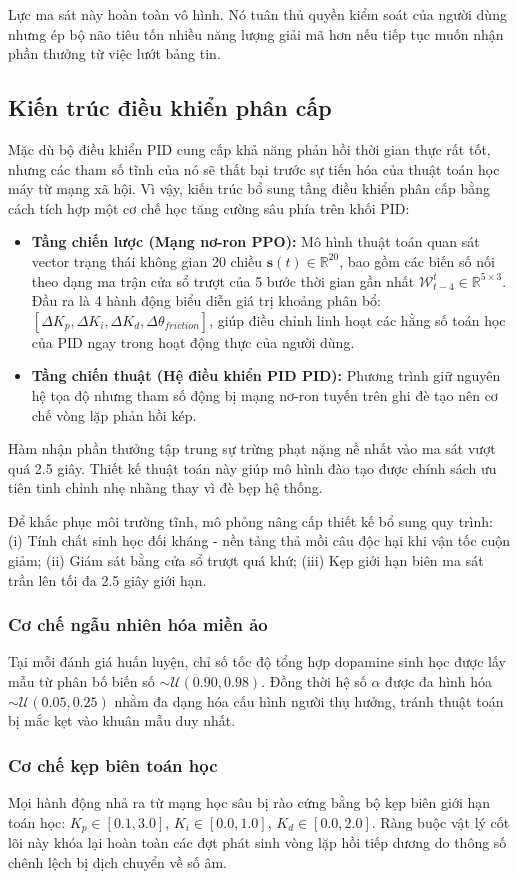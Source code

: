 Lực ma sát này hoàn toàn vô hình. Nó tuân thủ quyền kiểm soát của người dùng nhưng ép bộ não tiêu tốn nhiều năng lượng giải mã hơn nếu tiếp tục muốn nhận phần thưởng từ việc lướt bảng tin.

\subsection{Kiến trúc điều khiển phân cấp}

Mặc dù bộ điều khiển PID cung cấp khả năng phản hồi thời gian thực rất tốt, nhưng các tham số tĩnh của nó sẽ thất bại trước sự tiến hóa của thuật toán học máy từ mạng xã hội. Vì vậy, kiến trúc bổ sung tầng điều khiển phân cấp bằng cách tích hợp một cơ chế học tăng cường sâu phía trên khối PID:

\begin{itemize}
    \item \textbf{Tầng chiến lược (Mạng nơ-ron PPO):} Mô hình thuật toán quan sát vector trạng thái không gian 20 chiều $\mathbf{s}(t) \in \mathbb{R}^{20}$, bao gồm các biến số nối theo dạng ma trận cửa sổ trượt của 5 bước thời gian gần nhất $\mathcal{W}_{t-4}^{t} \in \mathbb{R}^{5 \times 3}$. Đầu ra là 4 hành động biểu diễn giá trị khoảng phân bổ: $[\Delta K_p, \Delta K_i, \Delta K_d, \Delta\theta_{friction}]$, giúp điều chỉnh linh hoạt các hằng số toán học của PID ngay trong hoạt động thực của người dùng.
    \item \textbf{Tầng chiến thuật (Hệ điều khiển PID PID):} Phương trình giữ nguyên hệ tọa độ nhưng tham số động bị mạng nơ-ron tuyến trên ghi đè tạo nên cơ chế vòng lặp phản hồi kép.
\end{itemize}

Hàm nhận phần thưởng tập trung sự trừng phạt nặng nề nhất vào ma sát vượt quá 2.5 giây. Thiết kế thuật toán này giúp mô hình đào tạo được chính sách ưu tiên tinh chỉnh nhẹ nhàng thay vì đè bẹp hệ thống.

Để khắc phục môi trường tĩnh, mô phỏng nâng cấp thiết kế bổ sung quy trình: (i) Tính chất sinh học đối kháng - nền tảng thả mồi câu độc hại khi vận tốc cuộn giảm; (ii) Giám sát bằng cửa sổ trượt quá khứ; (iii) Kẹp giới hạn biên ma sát trần lên tối đa 2.5 giây giới hạn.

\subsubsection{Cơ chế ngẫu nhiên hóa miền ảo}
Tại mỗi đánh giá huấn luyện, chỉ số tốc độ tổng hợp dopamine sinh học được lấy mẫu từ phân bố biến số $\sim \mathcal{U}(0.90, 0.98)$. Đồng thời hệ số $\alpha$ được đa hình hóa $\sim \mathcal{U}(0.05, 0.25)$ nhằm đa dạng hóa cấu hình người thụ hưởng, tránh thuật toán bị mắc kẹt vào khuân mẫu duy nhất.

\subsubsection{Cơ chế kẹp biên toán học}
Mọi hành động nhả ra từ mạng học sâu bị rào cứng bằng bộ kẹp biên giới hạn toán học: $K_p \in [0.1, 3.0]$, $K_i \in [0.0, 1.0]$, $K_d \in [0.0, 2.0]$. Ràng buộc vật lý cốt lõi này khóa lại hoàn toàn các đợt phát sinh vòng lặp hồi tiếp dương do thông số chênh lệch bị dịch chuyển về số âm.
